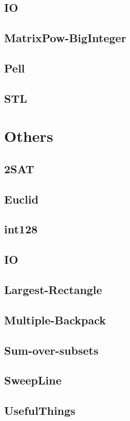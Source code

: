 \documentclass{article}
\begin{document}
\subsection{IO}

\subsection{MatrixPow-BigInteger}

\subsection{Pell}

\subsection{STL}

\section{Others}
\subsection{2SAT}

\subsection{Euclid}

\subsection{int128}

\subsection{IO}

\subsection{Largest-Rectangle}

\subsection{Multiple-Backpack}

\subsection{Sum-over-subsets}

\subsection{SweepLine}

\subsection{UsefulThings}

\end{document}
